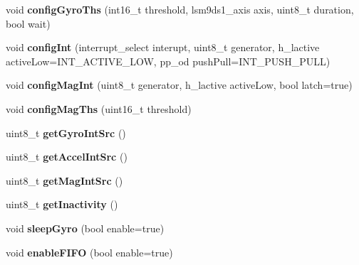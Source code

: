 \begin{DoxyCompactItemize}
\item 
void {\bfseries config\+Gyro\+Ths} (int16\+\_\+t threshold, lsm9ds1\+\_\+axis axis, uint8\+\_\+t duration, bool wait)\hypertarget{classLSM9DS1_ad865cc972960ed476fabd54f698adf6e}{}\label{classLSM9DS1_ad865cc972960ed476fabd54f698adf6e}

\item 
void {\bfseries config\+Int} (interrupt\+\_\+select interupt, uint8\+\_\+t generator, h\+\_\+lactive active\+Low=I\+N\+T\+\_\+\+A\+C\+T\+I\+V\+E\+\_\+\+L\+OW, pp\+\_\+od push\+Pull=I\+N\+T\+\_\+\+P\+U\+S\+H\+\_\+\+P\+U\+LL)\hypertarget{classLSM9DS1_a5b6948b9d4caf57cfe9e0559a0c7f54c}{}\label{classLSM9DS1_a5b6948b9d4caf57cfe9e0559a0c7f54c}

\item 
void {\bfseries config\+Mag\+Int} (uint8\+\_\+t generator, h\+\_\+lactive active\+Low, bool latch=true)\hypertarget{classLSM9DS1_a54a521668eb63d504d227c6d460723e0}{}\label{classLSM9DS1_a54a521668eb63d504d227c6d460723e0}

\item 
void {\bfseries config\+Mag\+Ths} (uint16\+\_\+t threshold)\hypertarget{classLSM9DS1_a87cf3dd3a4d9ca79106eb7c1c866a224}{}\label{classLSM9DS1_a87cf3dd3a4d9ca79106eb7c1c866a224}

\item 
uint8\+\_\+t {\bfseries get\+Gyro\+Int\+Src} ()\hypertarget{classLSM9DS1_aaba6696754df62a411a6a190100f9ca3}{}\label{classLSM9DS1_aaba6696754df62a411a6a190100f9ca3}

\item 
uint8\+\_\+t {\bfseries get\+Accel\+Int\+Src} ()\hypertarget{classLSM9DS1_ae42ae3b368370f977d090ba0e53c7f5c}{}\label{classLSM9DS1_ae42ae3b368370f977d090ba0e53c7f5c}

\item 
uint8\+\_\+t {\bfseries get\+Mag\+Int\+Src} ()\hypertarget{classLSM9DS1_a2bc92a37db982059b89e0a06e7d05a95}{}\label{classLSM9DS1_a2bc92a37db982059b89e0a06e7d05a95}

\item 
uint8\+\_\+t {\bfseries get\+Inactivity} ()\hypertarget{classLSM9DS1_a9dab029d1d24e49709258d893042d28f}{}\label{classLSM9DS1_a9dab029d1d24e49709258d893042d28f}

\item 
void {\bfseries sleep\+Gyro} (bool enable=true)\hypertarget{classLSM9DS1_a13b61812069b399547f177b0b0af8fe3}{}\label{classLSM9DS1_a13b61812069b399547f177b0b0af8fe3}

\item 
void {\bfseries enable\+F\+I\+FO} (bool enable=true)\hypertarget{classLSM9DS1_a5f01141131318697838f15d7e5d10f2c}{}\label{classLSM9DS1_a5f01141131318697838f15d7e5d10f2c}


\end{DoxyCompactItemize}
